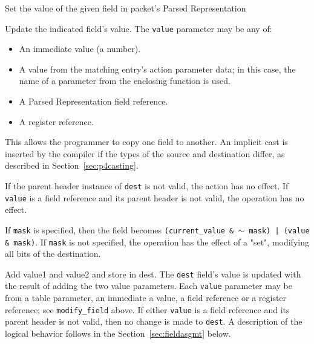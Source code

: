 \documentclass[12pt]{article}
\begin{document}
{ %
Set the value of the given field in packet's Parsed Representation
}
{ %
}
{ %
Update the indicated field's value. The \texttt{value} parameter may be any of:

\begin{itemize}
\item
An immediate value (a number).
\item
A value from the matching entry's action parameter data; in this case, the 
name of a parameter from the enclosing function is used.
\item
A Parsed Representation field reference.
\item
A register reference.
\end{itemize}


This allows the programmer to copy one field to another.  An implicit
cast is inserted by the compiler if the types of the source and
destination differ, as described in Section~\ref{sec:p4casting}.

If the parent header instance of \texttt{dest} is not valid, the action has no effect. 
If \texttt{value} is a field reference and its parent header is not valid, the operation 
has no effect.

If \texttt{mask} is specified, then the field becomes \texttt{(current_value \& $\sim$ mask) | 
(value \& mask)}.  If \texttt{mask} is not specified, the operation has the effect 
of a "set", modifying all bits of the destination.

}


{ %
Add value1 and value2 and store in dest.
}
{ %
}
{ %
The \texttt{dest} field's value is updated with the result of adding
the two value parameters. Each \texttt{value} parameter may be from a
table parameter, an immediate a value, a field reference or a register
reference; see \texttt{modify_field} above.  If either \texttt{value}
is a field reference and its parent header is not valid, then no
change is made to \texttt{dest}.  A description of the logical
behavior follows in the Section~\ref{sec:fieldasgmt} below.
}
\end{document}
